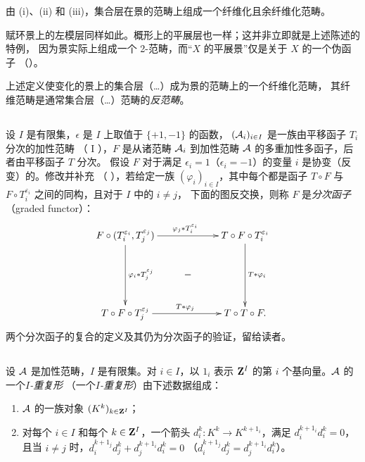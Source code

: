 由 (i)、(ii) 和 (iii)，集合层在景的范畴上组成一个纤维化且余纤维化范畴。

赋环景上的左模层同样如此。概形上的平展层也一样；这并非立即就是上述陈述的特例，
因为景实际上组成一个 2-范畴，而“$X$ 的平展景”仅是关于 $X$ 的一个伪函子
（）。

上述定义使变化的景上的集合层（\resp\ldots）成为景的范畴上的一个纤维化范畴，
其纤维范畴是通常集合层（\resp\ldots）范畴的\emph{反范畴}。

\subsection{}
设 $I$ 是有限集，$\epsilon$ 是 $I$ 上取值于 $\{+1,-1\}$ 的函数，
$({\mathcal A}_i)_{i\in I}$ 是一族由平移函子 $T_i$ 分次的加性范畴
（\cite{sga4.exp.XVII.bib.CD} I ），$F$ 是从诸范畴 ${\mathcal A}_i$
到加性范畴 ${\mathcal A}$ 的多重加性多函子，后者由平移函子 $T$ 分次。
假设 $F$ 对于满足 $\epsilon_i=1$（\resp $\epsilon_i=-1$）的变量 $i$
是协变（\resp 反变）的。修改并补充\pageoriginale
（\cite{sga4.exp.XVII.bib.CD} ），若给定一族
$(\varphi_i)_{i\in I}$，其中每个都是函子 $T\circ F$ 与
$F\circ T_i^{\varepsilon_{i}}$ 之间的同构，且对于 $I$ 中的 $i\neq j$，
下面的图反交换，则称 $F$ 是\emph{分次函子}（graded functor）：
\[
\xymatrix{
F \circ (T_i^{\varepsilon_i}, T_j^{\varepsilon_j})  \ar[rr]^{\varphi_j
  \ast T_i^{\varepsilon_i}} \ar[dd]^{\varphi_i\ast T_j^{\varepsilon_j}}& &T\circ F \circ T_i^{\varepsilon_i} \ar[dd]^{T\ast
  \varphi_i}\\
 & - & \\
 T\circ F \circ T_j^{\varepsilon_j}  \ar[rr]^{T\ast \varphi_j} & &T\circ T
  \circ F.
}
\]
两个分次函子的复合的定义及其仍为分次函子的验证，留给读者。

\subsection{}
设 ${\mathcal A}$ 是加性范畴，$I$ 是有限集。对 $i\in I$，以 $1_i$ 表示
$\mathbf{Z}^{I}$ 的第 $i$ 个基向量。${\mathcal A}$ 的一个\emph{$I$-重复形}
（\resp 一个\emph{$I$-重复形}）由下述数据组成：
\begin{enumerate}
\renewcommand{\theenumi}{\alph{enumi}}
\renewcommand{\labelenumi}{(\theenumi)}
\item ${\mathcal A}$ 的一族对象 $(K^{k})_{k\in \mathbf{Z}^{I}}$；

\item 对每个 $i\in I$ 和每个 $k\in \mathbf{Z}^{I}$，一个箭头
  $d^{k}_i:K^{k}\rightarrow K^{k+1_i}$，满足 $d^{k+1_i}_i d^{k}_i=0$，
  且当 $i\neq j$ 时，$d^{k+1_j}_i d^{k}_j+d^{k+1_i}_j d^{k}_i=0$
  （\resp $d^{k+1_j}_i d^{k}_j=d^{k+1_i}_j d^{k}_i$）。
\end{enumerate}

